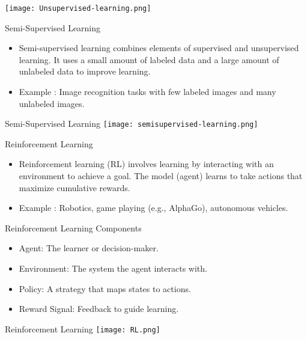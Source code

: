 \documentclass[serif, aspectratio=169]{beamer}
\begin{document}
\begin{frame}
    \centering
    \texttt{[image: Unsupervised-learning.png]}
\end{frame}


\begin{frame}{Semi-Supervised Learning}
    \begin{itemize}
        \item Semi-supervised learning combines elements of supervised and unsupervised learning. It uses a small amount of labeled data and a large amount of unlabeled data to improve learning.
        \item Example : Image recognition tasks with few labeled images and many unlabeled images.
    \end{itemize}
\end{frame}

\begin{frame}{Semi-Supervised Learning}
    \centering
    \texttt{[image: semisupervised-learning.png]}
\end{frame}

\begin{frame}{Reinforcement Learning}
    \begin{itemize}
        \item Reinforcement learning (RL) involves learning by interacting with an environment to achieve a goal. The model (agent) learns to take actions that maximize cumulative rewards.
        \item Example : Robotics, game playing (e.g., AlphaGo), autonomous vehicles.
    \end{itemize}
\end{frame}

\begin{frame}{Reinforcement Learning Components}
    \begin{itemize}
        \item Agent: The learner or decision-maker.
        \item Environment: The system the agent interacts with.
        \item Policy: A strategy that maps states to actions.
        \item Reward Signal: Feedback to guide learning.
    \end{itemize}
\end{frame}

\begin{frame}{Reinforcement Learning}
    \centering
    \texttt{[image: RL.png]}
\end{frame}
\end{document}
